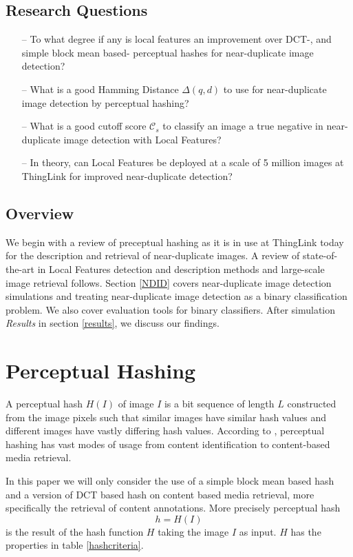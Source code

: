 \documentclass[english,12pt,a4paper,pdftex,elec,utf8, table]{aaltothesis}
\begin{document}
\subsection{Research Questions}
\begin{itemize}
\item[--] To what degree if any is local features an improvement over DCT-, and simple block mean based- perceptual hashes for near-duplicate image detection?
\item[--] What is a good Hamming Distance $\Delta(q,d)$ to use for near-duplicate image detection by perceptual hashing?
\item[--] What is a good cutoff score $\mathcal{C}_s$ to classify an image a true negative in near-duplicate image detection with Local Features?
\item[--] In theory, can Local Features be deployed at a scale of 5 million images at ThingLink for improved near-duplicate detection?
\end{itemize}

\subsection{Overview}
We begin with a review of preceptual hashing as it is in use at ThingLink today for the description and retrieval of near-duplicate images. A review of state-of-the-art in Local Features detection and description methods and large-scale image retrieval follows. Section \ref{NDID} covers near-duplicate image detection simulations and treating near-duplicate image detection as a binary classification problem. We also cover evaluation tools for binary classifiers. After simulation \emph{Results} in section \ref{results}, we discuss our findings.

\clearpage

\section{Perceptual Hashing}\label{perceptualhash}
A perceptual hash $H(I)$ of image $I$ is a bit sequence of length $L$ constructed from the image pixels such that similar images have similar hash values and different images have vastly differing hash values. According to \cite{Zauner2010}, perceptual hashing has vast modes of usage from content identification to content-based media retrieval.

In this paper we will only consider the use of a simple block mean based hash and a version of DCT based hash on content based media retrieval, more specifically the retrieval of content annotations. More precisely perceptual hash
\begin{equation}\label{hashfunction}
h = H(I)
\end{equation}
is the result of the hash function $H$ taking the image $I$ as input. $H$ has the properties in table \ref{hashcriteria}.
\end{document}

